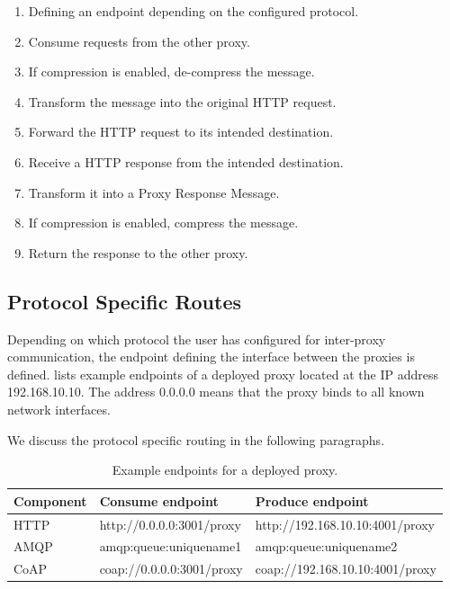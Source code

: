 \begin{enumerate}
	\item Defining an endpoint depending on the configured protocol.
	\item Consume requests from the other proxy.
	\item If compression is enabled, de-compress the message.
	\item Transform the message into the original HTTP request.
	\item Forward the HTTP request to its intended destination.
	\item Receive a HTTP response from the intended destination.
	\item Transform it into a Proxy Response Message.
	\item If compression is enabled, compress the message.
	\item Return the response to the other proxy.
\end{enumerate}

\subsection{Protocol Specific Routes}
\label{section:protocol-routes}

Depending on which protocol the user has configured for inter-proxy
communication, the endpoint defining the interface between the proxies is
defined.  lists example endpoints of a deployed
proxy located at the IP address 192.168.10.10. The address 0.0.0.0 means that
the proxy binds to all known network interfaces.

 We discuss the protocol specific routing in the following paragraphs.

\begin{table}[h]
\begin{tabular}{|l|l|l|}
\hline
\textbf{Component} & \textbf{Consume endpoint} & \textbf{Produce endpoint}       \\ \hline
HTTP               & http://0.0.0.0:3001/proxy & http://192.168.10.10:4001/proxy \\ \hline
AMQP               & amqp:queue:uniquename1    & amqp:queue:uniquename2          \\ \hline
CoAP               & coap://0.0.0.0:3001/proxy & coap://192.168.10.10:4001/proxy \\ \hline
\end{tabular}
\caption{Example endpoints for a deployed proxy.}
\label{table:example-endpoints}
\end{table}


